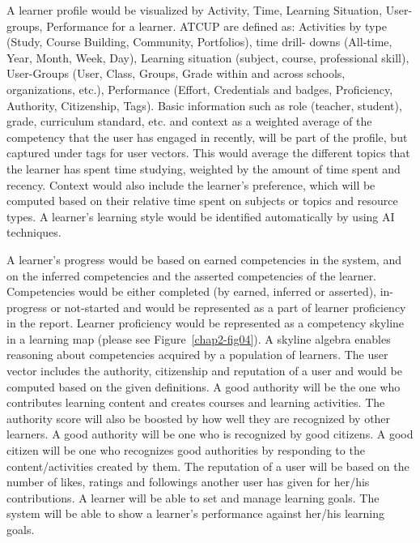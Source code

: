 \begin{multicols}{2}
\newpage

A learner profile would be visualized by Activity, Time, Learning Situation, User-groups, Performance for a learner. ATCUP are defined as: Activities by type (Study, Course Building, Community, Portfolios), time drill- downs (All-time, Year, Month, Week, Day), Learning situation (subject, course, professional skill), User-Groups (User, Class, Groups, Grade within and across schools, organizations, etc.), Performance (Effort, Credentials and badges, Proficiency, Authority, Citizenship, Tags). Basic information such as role (teacher, student), grade, curriculum standard, etc. and context as a weighted average of the competency that the user has engaged in recently, will be part of the profile, but captured under tags for user vectors. This would average the different topics that the learner has spent time studying, weighted by the amount of time spent and recency. Context would also include the learner’s preference, which will be computed based on their relative time spent on subjects or topics and resource types. A learner’s learning style would be identified automatically by using AI techniques.

A learner’s progress would be based on earned competencies in the system, and on the inferred competencies and the asserted competencies of the learner. Competencies would be either completed (by earned, inferred or asserted), in-progress or not-started and would be represented as a part of learner proficiency in the report. Learner proficiency would be represented as a competency skyline in a learning map (please see Figure~\ref{chap2-fig04}). A skyline algebra enables reasoning about competencies acquired by a population of learners. The user vector includes the authority, citizenship and reputation of a user and would be computed based on the given definitions. A good authority will be the one who contributes learning content and creates courses and learning activities. The authority score will also be boosted by how well they are recognized by other learners. A good authority will be one who is recognized by good citizens. A good citizen will be one who recognizes good authorities by responding to the content/activities created by them. The reputation of a user will be based on the number of likes, ratings and followings another user has given for her/his contributions. A learner will be able to set and manage learning goals. The system will be able to show a learner’s performance against her/his learning goals.


\end{multicols}

